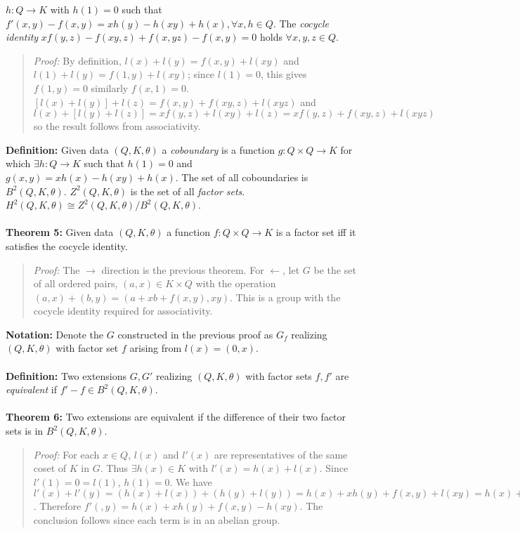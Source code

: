 $h:Q \rightarrow K$ with $h(1)=0$ such that 
$f'(x,y)-f(x,y)= xh(y)-h(xy)+h(x), \forall x,h \in Q$.
The \emph{cocycle identity} $xf(y,z)-f(xy,z)+f(x,yz)-f(x,y)=0$ holds $\forall x,y,z \in Q$.
\begin{quote}
\emph{Proof:}  
By definition, 
$l(x) + l(y)= f(x,y) + l(xy)$
and
$l(1) + l(y)= f(1,y) + l(xy)$; since $l(1)=0$, this gives $f(1,y)=0$ similarly $f(x,1)=0$.
$[l(x)+l(y)]+l(z) = f(x,y)+f(xy,z)+l(xyz)$ and
$l(x)+[l(y)+l(z)] = xf(y,z)+l(xy)+l(z)= xf(y,z)+f(xy,z)+l(xyz)$ so the result follows from associativity.
\end{quote}
{\bf Definition:}  Given data $(Q, K, \theta)$ a \emph{coboundary} is a function
$g: Q \times Q \rightarrow K$ for which $\exists h: Q \rightarrow K$ such that
$h(1)=0$ and $g(x,y)= xh(x)-h(xy)+h(x)$.
The set of all coboundaries is $B^2 (Q,K,\theta)$.
$Z^2 (Q, K, \theta)$ is the set of all \emph{ factor sets}.
$H^2 (Q, K, \theta) \cong Z^2 (Q, K, \theta) / B^2 (Q, K, \theta)$.
\\
\\
{\bf Theorem 5:} 
Given data $(Q, K, \theta)$ a function $f: Q \times Q \rightarrow K$ is a factor set iff it satisfies the
cocycle identity.
\begin{quote}
\emph{Proof:}  
The $\rightarrow$ direction is the previous theorem.  For $\leftarrow$, let $G$ be the set of all ordered pairs,
$(a,x) \in K \times Q$ with the operation
$(a,x)+(b,y)= (a+xb+f(x,y), xy)$.  This is a group with the cocycle identity required for associativity.
\end{quote}
{\bf Notation:} Denote the $G$ constructed in the previous proof as $G_f$ realizing
$(Q, K, \theta )$ with factor set $f$ arising from $l(x)= (0,x)$.
\\
\\
{\bf Definition:}
Two extensions $G, G'$ realizing
$(Q, K, \theta )$ with factor sets $f, f'$ are \emph{equivalent} if $f'-f \in B^2(Q, K, \theta)$.
\\
\\
{\bf Theorem 6:}
Two extensions are equivalent if the difference of
their two factor sets is in $B^2 (Q, K, \theta)$.
\begin{quote}
\emph{Proof:}  
For each $x \in Q$, $l(x)$ and $l'(x)$ are representatives of the same coset
of $K$ in $G$.  Thus $\exists h(x) \in K$ with $l'(x)= h(x) + l(x)$.  Since
$l'(1)= 0 = l(1)$, $h(1) = 0$.  We have
$l'(x) + l'(y) =
(h(x) + l(x)) +
(h(y) + l(y)) =
h(x) + x h(y) + f(x, y) + l(xy) =
h(x) + x h(y) + f(x, y) - h(xy) + l'(xy)$.  Therefore
$f'(, y)= h(x) + x h(y) + f(x, y) - h(xy)$.  The conclusion follows since each term
is in an abelian group.
\end{quote}
